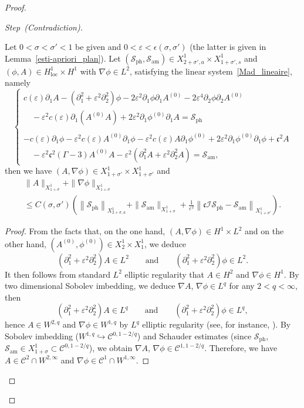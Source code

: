 \documentclass[AHL,Unicode,longabstracts,published]{cedram}
\newcommand*\p{\partial}
\newcommand{\amm}{\mathrm{am}}
\newcommand{\phl}{\mathrm{ph}}
\newcommand{\locc}{\mathrm{loc}}
\newcommand*\BC{\mathcal{C}}
\newcommand*\BI{\mathcal{I}}
\newcommand*\BS{\mathcal{S}}
\newcommand*\cs{{\mathfrak c}}
\newcommand*\ii{\infty}
\newcommand*\ls{\leqslant }
\newcommand*\e{\varepsilon}
\newcommand*\ep{\epsilon}
\newcommand*\s{\sigma}
\newcounter{stepcount}
\newenvironment{step}[1]{\refstepcounter{stepcount}\begin{proof}[{Step~\thestepcount}{\;(#1)}]}{\let\qed\relax\end{proof}}
\begin{document}
\begin{proof}
\begin{step}{{Contradiction}}
\begin{lemm}\label{H1suffit}
Let $ 0 < \s < \s' < 1 $ be given and $ 0 < \e < \ep(\s, \s') $ (the latter is given in Lemma~\ref{esti-apriori_plan}). Let $ (\BS_{\phl}, \BS_{\amm}) \in X^{1}_{2+\s', a} \times X^{1}_{1+\s', s} $ and $ (\phi, A) \in H^{1}_{\locc} \times H^1 $ with $ \nabla \phi \in L^{2} $, satisfying the linear system~\eqref{Mad_lineaire}, namely
\begin{equation*}
\left\{
\begin{array}{ll}
c(\e) \p_{1} A - \left(\p_{1}^2 + \e^2 \p^2_{2}\right) \phi - 2 \e^2 \p_{1} \phi \p_{1} A^{(0)} - 2 \e^4 \p_{2} \phi \p_{2} A^{(0)}
\\
\quad - \e^2 c(\e) \p_1 \left(A^{(0)} A\right) + 2 \e^2 \p_{1} \phi^{(0)} \p_{1} A = \BS_{\phl} \\ \ \\
- c(\e) \p_{1} \phi - \e^2 c(\e) A^{(0)} \p_1 \phi - \e^2 c(\e) A \p_1 \phi^{(0)} + 2 \e^2 \p_{1} \phi^{(0)} \p_{1} \phi + \cs^2 A
\\
\quad - \e^2 \cs^2 (\Gamma -3) A^{(0)} A - \e^2 \left(\p_{1}^2 A + \e^2 \p_{2}^2 A\right) = \BS_{\amm},
\end{array}\right.
\end{equation*}
then we have $ (A, \nabla \phi) \in X^{1}_{ 1+\s'} \times X^{1}_{ 1+ \s'} $ and
\begin{multline*}
\| A \|_{ X^1_{ 1+ \s} } + \| \nabla \phi \|_{ X^1_{1+ \s} }
\\
\ls C (\s, \s')
\left(
\left\| \BS_{\phl} \right\|_{ X^{1}_{ 2+\s, a} } + \| \BS_{\amm} \|_{ X^{ 1}_{1+\s} } + \frac{1}{\e^2} \left\| \cs \BI \BS_{\phl} - \BS_{\amm} \right\|_{ X^{1}_{1+\s'} }
\right).
\end{multline*}
\end{lemm}

\begin{proof}
From the facts that, on the one hand, $ (A, \nabla \phi) \in H^{1} \times L^{2} $ and on the other hand, $ (A^{(0)}, \phi^{(0)}) \in X^1_2 \times X^1_1 $, we deduce
\[
\left(\p_{1}^2 + \e^2 \p_{2}^2\right) A \in L^2
\qquad \text{and} \qquad \left(\p_{1}^2 + \e^2 \p_{2}^2\right) \phi \in L^2.
\]
It then follows from standard $ L^2 $ elliptic regularity that $ A \in H^2 $ and $ \nabla \phi \in H^1 $. By two dimensional Sobolev imbedding, we deduce $ \nabla A $, $ \nabla \phi \in L^q $ for any $ 2 < q < \ii $, then
\[
\left(\p_{1}^2 + \e^2 \p_{2}^2\right) A \in L^q
\qquad \text{and} \qquad \left(\p_{1}^2 + \e^2 \p_{2}^2\right) \phi \in L^q,
\]
hence $ A \in W^{2, q} $ and $ \nabla \phi \in W^{1, q} $ by $ L^q $ elliptic regularity (see, for instance, \cite[Theorem~9.9]{Gil-Tru}). By Sobolev imbedding ($ W^{1,q} \hookrightarrow \BC^{0, 1-2/q} $) and Schauder estimates (since $ \BS_{\phl} $, $ \BS_{\amm} \in X^1_{1 +\s} \subset \BC^{0, 1-2/q }$), we obtain $ \nabla A $, $ \nabla \phi \in \BC^{1, 1-2/q} $. Therefore, we have $ A \in \BC^2 \cap W^{2,\ii} $ and $ \nabla \phi \in \BC^1 \cap W^{1,\ii} $.


\end{proof}
\end{step}
\end{proof}
\end{document}
